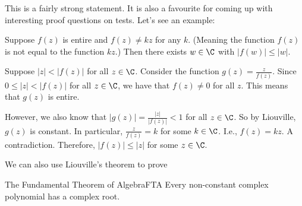 This is a fairly strong statement. It is also a favourite for coming up with interesting proof questions on tests. Let's see an example:

\begin{ex}{}{} Suppose $f(z)$ is entire and $f(z)\ne kz$ for any $k$. (Meaning the function $f(z)$ is not equal to the function $kz$.) Then there exists $w\in \C$ with $|f(w)|\le|w|$.

Suppose $|z| < |f(z)|$ for all $z\in \C$. Consider the function $g(z) = \frac{z}{f(z)}$. Since $0 \le |z| < |f(z)|$ for all $z\in \C$, we have that $f(z)\ne 0$ for all $z$. This means that $g(z)$ is entire.

However, we also know that $|g(z)| = \frac{|z|}{|f(z)|} < 1$ for all $z\in \C$. So by Liouville, $g(z)$ is constant. In particular, $\frac{z}{f(z)} = k$ for some $k\in \C$. I.e., $f(z) = kz$. A contradiction. Therefore, $|f(z)|\le |z|$ for some $z\in \C$.

\end{ex}

We can also use Liouville's theorem to prove 


\begin{thmbo}{The Fundamental Theorem of Algebra}{FTA}
Every non-constant complex polynomial has a complex root.
\end{thmbo}

